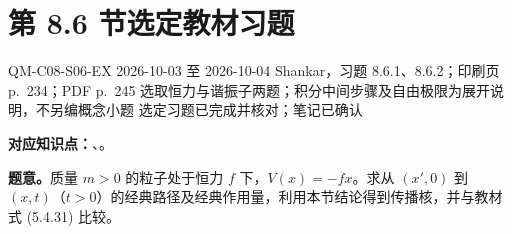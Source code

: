 \section{第 8.6 节选定教材习题}
\label{exercise-set:QM-C08-S06}
\exercisemeta
  {QM-C08-S06-EX}
  {2026-10-03 至 2026-10-04}
  {Shankar，习题 8.6.1、8.6.2；印刷页 p.~234；PDF p.~245}
  {选取恒力与谐振子两题；积分中间步骤及自由极限为展开说明，不另编概念小题}
  {选定习题已完成并核对；笔记已确认}

\textbf{对应知识点：}、。

\textbf{题意。}质量 $m>0$ 的粒子处于恒力 $f$ 下，$V(x)=-fx$。求从 $(x',0)$ 到 $(x,t)$（$t>0$）的经典路径及经典作用量，利用本节结论得到传播核，并与教材式 (5.4.31) 比较。

